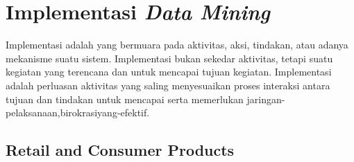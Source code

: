 \section{Implementasi \textit{Data Mining} }

\par Implementasi adalah yang bermuara pada
aktivitas, aksi, tindakan, atau adanya mekanisme
suatu sistem. Implementasi bukan sekedar aktivitas,
tetapi suatu kegiatan yang terencana dan untuk
mencapai tujuan kegiatan. Implementasi adalah
perluasan aktivitas yang saling menyesuaikan proses
interaksi antara tujuan dan tindakan untuk mencapai
serta memerlukan jaringan-pelaksanaan,birokrasiyang-efektif. \cite{tampubolon2013implementasi}

\subsection{Retail and Consumer Products}

